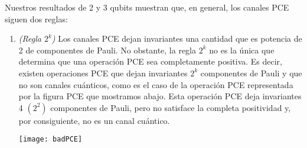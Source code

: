 Nuestros resultados de 2 y 3 qubits muestran que, en general, los canales 
PCE siguen dos reglas:
\begin{enumerate}
	\item \textit{(Regla $2^k$)} Los canales PCE dejan invariantes una cantidad 
	que es potencia de 2 de componentes de Pauli. No obstante, la regla $2^k$
	no es la única que determina que una operación PCE sea completamente
	positiva. Es decir, existen operaciones PCE que dejan invariantes $2^k$
	componentes de Pauli y que no son canales cuánticos, como es el caso 
	de la operación PCE representada por la figura PCE que mostramos abajo. Esta operación 
	PCE deja invariantes 4 $(2^2)$ componentes de Pauli, pero no satisface 
	la completa positividad y, por consiguiente, no es un canal cuántico.
	\begin{center}
		\texttt{[image: badPCE]}
	\end{center}
	

\end{enumerate}

